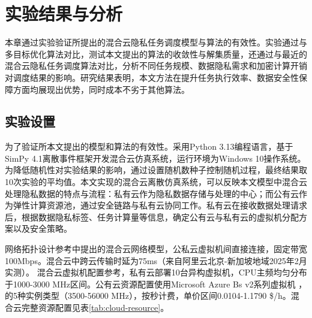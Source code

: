 \chapter{实验结果与分析}\label{chapter:experiements}

本章通过实验验证所提出的混合云隐私任务调度模型与算法的有效性。实验通过与多目标优化算法对比，测试本文提出的算法的收敛性与解集质量，还通过与最近的混合云隐私任务调度算法对比，分析不同任务规模、数据隐私需求和加密计算开销对调度结果的影响。研究结果表明，本文方法在提升任务执行效率、数据安全性保障方面均展现出优势，同时成本不劣于其他算法。

\section{实验设置}

为了验证所本文提出的模型和算法的有效性。采用Python 3.13编程语言，基于SimPy 4.1离散事件框架开发混合云仿真系统，运行环境为Windows 10操作系统。为降低随机性对实验结果的影响，通过设置随机数种子控制随机过程，最终结果取10次实验的平均值。本文实现的混合云离散仿真系统，可以反映本文模型中混合云处理隐私数据的特点与流程：私有云作为隐私数据存储与处理的中心；而公有云作为弹性计算资源池，通过安全链路与私有云协同工作。私有云在接收数据处理请求后，根据数据隐私标签、任务计算量等信息，确定公有云与私有云的虚拟机分配方案以及安全策略。

网络拓扑设计参考\parencite{leiPrivacySecurityawareWorkflow2022}中提出的混合云网络模型，公私云虚拟机间直接连接，固定带宽100Mbps。混合云中跨云传输时延为75ms（来自阿里云北京-新加坡地域2025年2月实测）。
混合云虚拟机配置参考\parencite{daghayeghiDelayAwareEnergyEfficientTask2024, belgacemMultiobjectiveWorkflowScheduling2022}，私有云部署10台异构虚拟机，CPU主频均匀分布于1000-3000 MHz区间。公有云资源配置使用Microsoft Azure Bs v2系列虚拟机 %
，的5种实例类型（3500-56000 MHz），按秒计费，单价区间0.0104-1.1790 \$/h。混合云完整资源配置见表\ref{tab:cloud-resource}。

